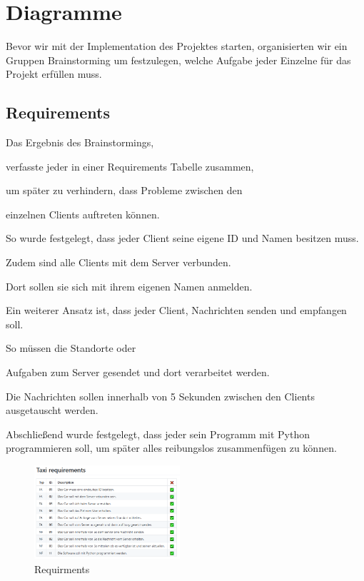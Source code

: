 \section{Diagramme}


Bevor wir mit der Implementation des Projektes starten, 
organisierten wir ein Gruppen Brainstorming um festzulegen, 
welche Aufgabe jeder Einzelne für das Projekt erfüllen muss. 



\subsection{Requirements}

Das Ergebnis des Brainstormings,
 
verfasste jeder in einer Requirements Tabelle zusammen,

um später zu verhindern, dass Probleme zwischen den

 einzelnen Clients auftreten können.


So wurde festgelegt, dass jeder Client seine eigene ID und Namen besitzen muss. 


Zudem sind alle Clients mit dem Server verbunden. 

Dort sollen sie sich mit ihrem eigenen Namen anmelden.


Ein weiterer Ansatz ist, dass jeder Client, Nachrichten senden und empfangen soll. 


So müssen die Standorte oder 

Aufgaben zum Server gesendet und dort verarbeitet werden.


Die Nachrichten sollen innerhalb von 5 Sekunden zwischen den Clients ausgetauscht werden.


Abschließend wurde festgelegt, dass jeder sein Programm mit Python programmieren soll, um später alles reibungslos zusammenfügen zu können.


\begin{figure}[htbp] 
  \centering
     \includegraphics[width=0.48\textwidth]{Bsp_requirments.png}
     \caption{Requirments}
\end{figure}




